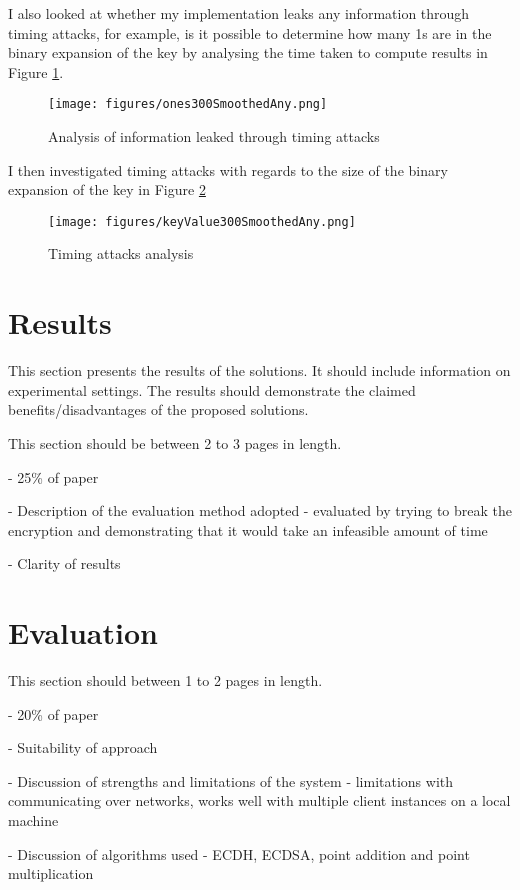 \documentclass[12pt,a4paper]{article}
\begin{document}
I also looked at whether my implementation leaks any information through timing attacks, 
for example, is it possible to determine how many 1s are in the binary expansion of the key by analysing the time taken to compute 
results in Figure \ref{fig:number1s}. 
\begin{figure}[htb]
    \centering
    \texttt{[image: figures/ones300SmoothedAny.png]}
    \caption{Analysis of information leaked through timing attacks}
    \label{fig:number1s}
\end{figure}

I then investigated timing attacks with regards to the size of the binary expansion of the key in Figure \ref{fig:logbase2}
\begin{figure}[htb]
    \centering
    \texttt{[image: figures/keyValue300SmoothedAny.png]}
    \caption{Timing attacks analysis}
    \label{fig:logbase2}
\end{figure}


\section{Results}
This section presents the results of the solutions. 
It should include information on experimental settings. 
The results should demonstrate the claimed benefits/disadvantages of the proposed solutions.

This section should be between 2 to 3 pages in length.

- 25\% of paper

- Description of the evaluation method adopted - evaluated by trying to break the encryption and demonstrating that it would take an infeasible amount of time

- Clarity of results


\section{Evaluation}
This section should between 1 to 2 pages in length.

- 20\% of paper

- Suitability of approach

- Discussion of strengths and limitations of the system - limitations with communicating over networks, works well with multiple client instances on a local machine

- Discussion of algorithms used - ECDH, ECDSA, point addition and point multiplication
\end{document}
